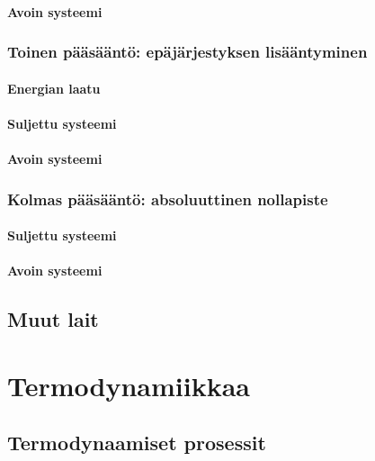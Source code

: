 \documentclass[12pt,a4paper,finnish]{book}
\begin{document}
\subsection{Avoin systeemi}

\section{Toinen pääsääntö: epäjärjestyksen lisääntyminen}

\subsection{Energian laatu}

\subsection{Suljettu systeemi}

\subsection{Avoin systeemi}

\section{Kolmas pääsääntö: absoluuttinen nollapiste}

\subsection{Suljettu systeemi}

\subsection{Avoin systeemi}

\chapter{Muut lait} %

\part{Termodynamiikkaa}%

\chapter{Termodynaamiset prosessit}
\end{document}
